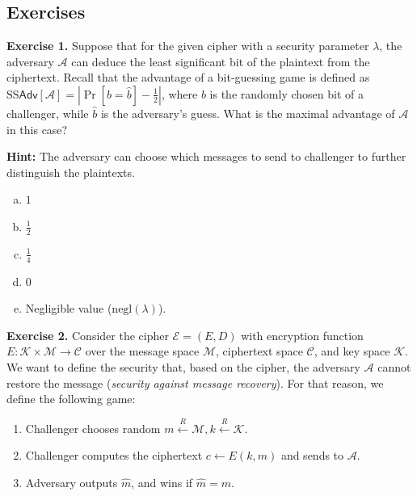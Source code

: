 \documentclass[../lecture-notes.tex]{subfiles}
\begin{document}
\subsection{Exercises}

\textbf{Exercise 1.} Suppose that for the given cipher with a security parameter $\lambda$, the adversary $\mathcal{A}$ can deduce the least significant bit of the plaintext from the ciphertext. Recall that the advantage 
of a bit-guessing game is defined as $\text{SS}\mathsf{Adv}[\mathcal{A}] = \left|\Pr[b=\hat{b}] - \frac{1}{2}\right|$, where $b$ is the randomly chosen bit of a challenger, while 
$\hat{b}$ is the adversary's guess. What is the maximal advantage of $\mathcal{A}$ in this case?

\textbf{Hint:} The adversary can choose which messages to send to challenger to further distinguish the plaintexts.

\begin{enumerate}[a)]
    \item $1$
    \item $\frac{1}{2}$
    \item $\frac{1}{4}$
    \item $0$
    \item Negligible value ($\text{negl}(\lambda)$).
\end{enumerate}

\textbf{Exercise 2.} Consider the cipher $\mathcal{E} = (E,D)$ with encryption function $E: \mathcal{K} \times \mathcal{M} \to \mathcal{C}$ over the message space $\mathcal{M}$, ciphertext space $\mathcal{C}$, and key space $\mathcal{K}$. We want to define the security
that, based on the cipher, the adversary $\mathcal{A}$ cannot restore the message (\textit{security against message recovery}). For that reason, we define the following game:
\begin{enumerate}
    \item Challenger chooses random $m \xleftarrow{R} \mathcal{M}, k \xleftarrow{R} \mathcal{K}$.
    \item Challenger computes the ciphertext $c \gets E(k,m)$ and sends to $\mathcal{A}$.
    \item Adversary outputs $\hat{m}$, and wins if $\hat{m} = m$.
\end{enumerate}
\end{document}
